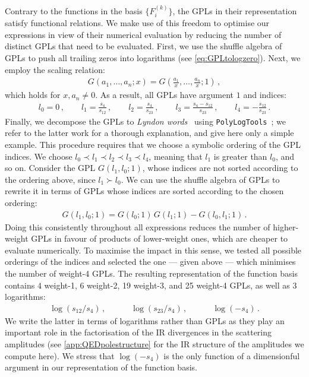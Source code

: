 \documentclass[main.tex]{subfiles}
\begin{document}
Contrary to the functions in the basis $\{F^{(k)}_i\}$, the GPLs in their representation satisfy functional relations. We make use of this freedom to optimise our expressions in view of their numerical evaluation by reducing the number of distinct GPLs that need to be evaluated. First, we use the shuffle algebra of GPLs to push all trailing zeros into logarithms (see \cref{eq:GPLtologzero}). Next, we employ the scaling relation:
\begin{align}
G(a_1, \ldots, a_n; x) = G\left(\frac{a_1}{x}, \ldots, \frac{a_n}{x}; 1\right) \,,
\end{align}
which holds for $x, a_n \neq 0$. As a result, all GPLs have argument $1$ and indices:
\begin{align} \label{eqQED:indices}
l_0 = 0 \,, \qquad 
l_1 = \frac{s_4}{s_{12}} \,, \qquad 
l_2 = \frac{s_4}{s_{23}} \,, \qquad
l_3 = \frac{s_4-s_{12}}{s_{23}} \,, \qquad
l_4 = - \frac{s_{12}}{s_{23}}\,.
\end{align}
%
Finally, we decompose the GPLs to \emph{Lyndon words}~\cite{Radford1979ANR} using \texttt{PolyLogTools}~\cite{Duhr:2019tlz}; we refer to the latter work for a thorough explanation, and give here only a simple example. 
This procedure requires that we choose a symbolic ordering of the GPL indices. We choose $l_0 \prec l_1 \prec l_2 \prec l_3 \prec l_4$, meaning that $l_1$ is greater than $l_0$, and so on. 
Consider the GPL $G(l_1, l_0; 1)$, whose indices are not sorted according to the ordering above, since $l_1 \succ l_0$. We can use the shuffle algebra of GPLs to rewrite it in terms of GPLs whose indices are sorted according to the chosen ordering:
\begin{align}
G(l_1, l_0; 1) = G(l_0;1) \, G(l_1;1) - G(l_0, l_1; 1) \,.
\end{align}
Doing this consistently throughout all expressions reduces the number of higher-weight GPLs in favour of products of lower-weight ones, which are cheaper to evaluate numerically. To maximise the impact in this sense, we tested all possible orderings of the indices and selected the one --- given above --- which minimises the number of weight-4 GPLs.
The resulting representation of the function basis contains $4$ weight-1, 6 weight-2, 19 weight-3, and 25 weight-4 GPLs, as well as $3$ logarithms: 
\begin{align} \label{eqQED:logs}
\log(s_{12}/s_4) \,, \qquad \quad \log(s_{23}/s_4) \,, \qquad \quad \log(-s_4) \,.
\end{align}
We write the latter in terms of logarithms rather than GPLs as they play an important role in the factorisation of the IR divergences in the scattering amplitudes (see \cref{app:QEDpolestructure} for the IR structure of the amplitudes we compute here). We stress that $\log(-s_4)$ is the only function of a dimensionful argument in our representation of the function basis. 
\end{document}
